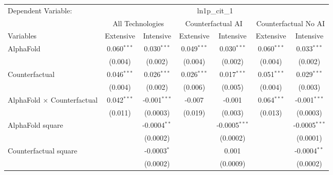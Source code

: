 \begingroup
\centering
\begin{tabular}{lcccccc}
   \tabularnewline \midrule \midrule
   Dependent Variable: & \multicolumn{6}{c}{ln1p\_cit\_1}\\
 & \multicolumn{2}{c}{All Technologies} & \multicolumn{2}{c}{Counterfactual AI} & \multicolumn{2}{c}{Counterfactual No AI} \\
\cmidrule(lr){1-1}\cmidrule(lr){2-3} \cmidrule(lr){4-5} \cmidrule(lr){6-7}
Variables & \multicolumn{1}{c}{Extensive} & \multicolumn{1}{c}{Intensive} & \multicolumn{1}{c}{Extensive} & \multicolumn{1}{c}{Intensive} & \multicolumn{1}{c}{Extensive} & \multicolumn{1}{c}{Intensive} \\
\cmidrule(lr){1-1}\cmidrule(lr){2-2} \cmidrule(lr){3-3} \cmidrule(lr){4-4} \cmidrule(lr){5-5} \cmidrule(lr){6-6} \cmidrule(lr){7-7}
   AlphaFold                          & 0.060$^{***}$ & 0.030$^{***}$     & 0.049$^{***}$ & 0.030$^{***}$   & 0.060$^{***}$ & 0.033$^{***}$\\   
                                      & (0.004)       & (0.002)           & (0.004)       & (0.002)         & (0.004)       & (0.002)\\   
   Counterfactual                     & 0.046$^{***}$ & 0.026$^{***}$     & 0.026$^{***}$ & 0.017$^{***}$   & 0.051$^{***}$ & 0.029$^{***}$\\   
                                      & (0.004)       & (0.002)           & (0.006)       & (0.005)         & (0.004)       & (0.003)\\   
   AlphaFold $\times$ Counterfactual  & 0.042$^{***}$ & -0.001$^{***}$    & -0.007        & -0.001          & 0.064$^{***}$ & -0.001$^{***}$\\   
                                      & (0.011)       & (0.0003)          & (0.019)       & (0.003)         & (0.013)       & (0.0003)\\   
   AlphaFold square                   &               & -0.0004$^{**}$    &               & -0.0005$^{***}$ &               & -0.0005$^{***}$\\   
                                      &               & (0.0002)          &               & (0.0002)        &               & (0.0001)\\   
   Counterfactual square              &               & -0.0003$^{*}$     &               & 0.001           &               & -0.0004$^{**}$\\   
                                      &               & (0.0002)          &               & (0.0009)        &               & (0.0002)\\   

\end{tabular}

